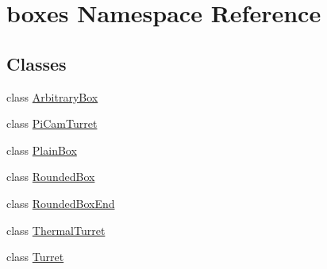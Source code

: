 \hypertarget{namespaceboxes}{}\section{boxes Namespace Reference}
\label{namespaceboxes}
\subsection*{Classes}
\begin{DoxyCompactItemize}
\item 
class \hyperlink{classboxes_1_1_arbitrary_box}{Arbitrary\+Box}
\item 
class \hyperlink{classboxes_1_1_pi_cam_turret}{Pi\+Cam\+Turret}
\item 
class \hyperlink{classboxes_1_1_plain_box}{Plain\+Box}
\item 
class \hyperlink{classboxes_1_1_rounded_box}{Rounded\+Box}
\item 
class \hyperlink{classboxes_1_1_rounded_box_end}{Rounded\+Box\+End}
\item 
class \hyperlink{classboxes_1_1_thermal_turret}{Thermal\+Turret}
\item 
class \hyperlink{classboxes_1_1_turret}{Turret}
\end{DoxyCompactItemize}
